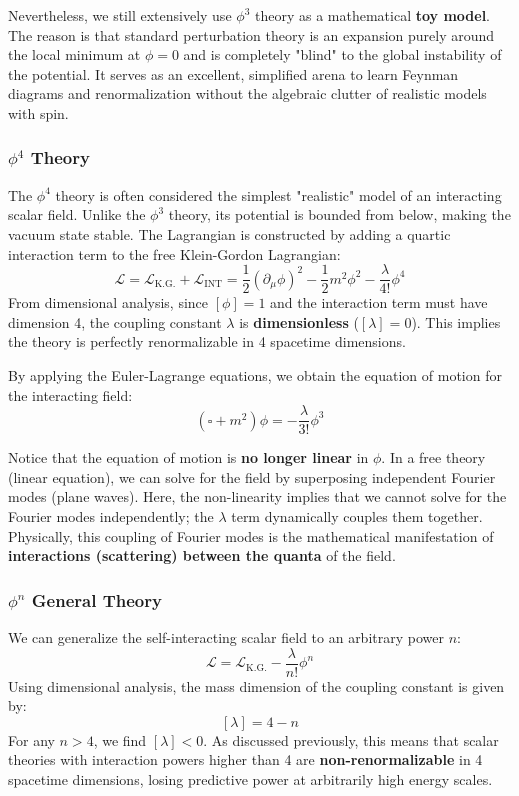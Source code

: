 Nevertheless, we still extensively use \(\phi^3\) theory as a mathematical \textbf{toy model}. The reason is that standard perturbation theory is an expansion purely around the local minimum at \(\phi = 0\) and is completely "blind" to the global instability of the potential. It serves as an excellent, simplified arena to learn Feynman diagrams and renormalization without the algebraic clutter of realistic models with spin.

\subsubsection{\(\phi^4\) Theory}

The \(\phi^4\) theory is often considered the simplest "realistic" model of an interacting scalar field. Unlike the \(\phi^3\) theory, its potential is bounded from below, making the vacuum state stable.
The Lagrangian is constructed by adding a quartic interaction term to the free Klein-Gordon Lagrangian:
\[
    \mathcal{L} = \mathcal{L}_{\text{K.G.}} + \mathcal{L}_{\text{INT}} = \frac{1}{2}(\partial_\mu \phi)^2 - \frac{1}{2}m^2 \phi^2 - \frac{\lambda}{4!} \phi^4
\]
From dimensional analysis, since \([\phi] = 1\) and the interaction term must have dimension 4, the coupling constant \(\lambda\) is \textbf{dimensionless} (\([\lambda] = 0\)). This implies the theory is perfectly renormalizable in 4 spacetime dimensions.

By applying the Euler-Lagrange equations, we obtain the equation of motion for the interacting field:
\[
    (\square + m^2)\phi = -\frac{\lambda}{3!} \phi^3
\]
\begin{remark}
    Notice that the equation of motion is \textbf{no longer linear} in \(\phi\). In a free theory (linear equation), we can solve for the field by superposing independent Fourier modes (plane waves). Here, the non-linearity implies that we cannot solve for the Fourier modes independently; the \(\lambda\) term dynamically couples them together. Physically, this coupling of Fourier modes is the mathematical manifestation of \textbf{interactions (scattering) between the quanta} of the field.
\end{remark}

\subsubsection{\(\phi^n\) General Theory}

We can generalize the self-interacting scalar field to an arbitrary power \(n\):
\[
    \mathcal{L} = \mathcal{L}_{\text{K.G.}} - \frac{\lambda}{n!} \phi^n
\]
Using dimensional analysis, the mass dimension of the coupling constant is given by:
\[
    [\lambda] = 4 - n
\]
For any \(n > 4\), we find \([\lambda] < 0\). As discussed previously, this means that scalar theories with interaction powers higher than 4 are \textbf{non-renormalizable} in 4 spacetime dimensions, losing predictive power at arbitrarily high energy scales.

